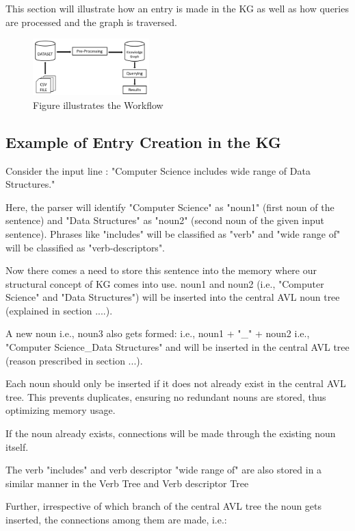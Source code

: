 \documentclass[conference]{IEEEtran}
\begin{document}
This section will illustrate how an entry is made in the KG as well as how queries are processed and the graph is traversed.

\begin{figure}[htbp]
\centerline{\includegraphics[width=0.4\textwidth]{workflow_fig.png}}
\caption{Figure illustrates the Workflow}
\label{fig}
\end{figure}
\subsection{\textbf{Example of Entry Creation in the KG}}

Consider the input line : "Computer Science includes wide range of
Data Structures."

Here, the parser will identify "Computer Science" as "noun1" (first noun of the sentence)
and "Data Structures" as "noun2" (second noun of the given input sentence).
Phrases like "includes" will be classified as "verb" and "wide range of" will be classified as "verb-descriptors".

Now there comes a need to store this sentence into the memory where our structural concept
of KG comes into use.
noun1 and noun2 (i.e., "Computer Science" and "Data Structures") will be inserted into the central AVL noun
tree (explained in section ....).

A new noun i.e., noun3 also gets formed: i.e., noun1 + "\_" + noun2 i.e., "Computer Science\_Data Structures"
and will be inserted in the central AVL tree (reason prescribed in section ...).

Each noun should only be inserted if it does not already exist in the central AVL tree. 
This prevents duplicates, ensuring no redundant nouns are stored, thus optimizing memory usage.

If the noun already exists, connections will be made through the existing noun itself.

The verb "includes" and verb descriptor "wide range of" are also stored in a similar manner
in the Verb Tree and Verb descriptor Tree

Further, irrespective of which branch of the central AVL tree the noun gets inserted, 
the connections among them are made, i.e.:
\end{document}
